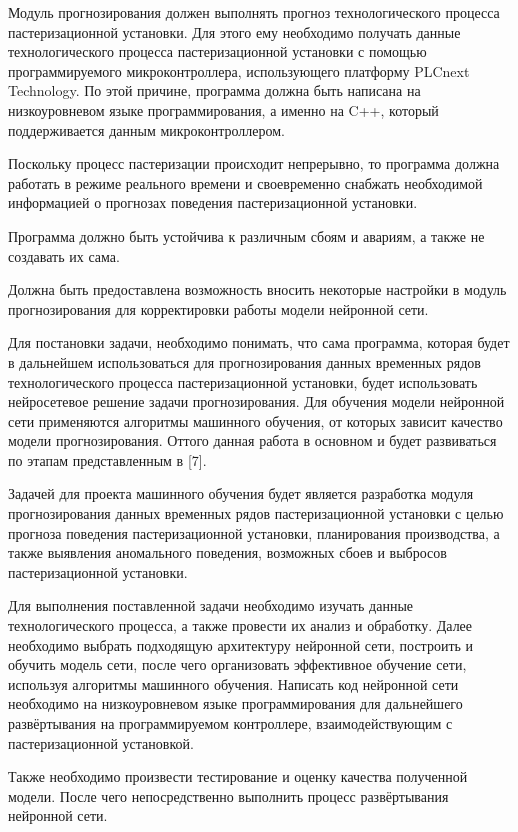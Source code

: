 {\gostFont
	\par \redline Модуль прогнозирования должен выполнять прогноз технологического процесса пастеризационной установки. Для этого ему необходимо получать данные технологического процесса пастеризационной установки с помощью программируемого микроконтроллера, использующего платформу PLCnext Technology. По этой причине, программа должна быть написана на низкоуровневом языке программирования, а именно на C++, который поддерживается данным микроконтроллером. 
	
	\par \redline Поскольку процесс пастеризации происходит непрерывно, то программа должна работать в режиме реального времени и своевременно снабжать необходимой информацией о прогнозах поведения пастеризационной установки. 
	
	\par \redline Программа должно быть устойчива к различным сбоям и авариям, а также не создавать их сама. 
	
	\par \redline Должна быть предоставлена возможность вносить некоторые настройки в модуль прогнозирования для корректировки работы модели нейронной сети. 
	
	\par \redline Для постановки задачи, необходимо понимать, что сама программа, которая будет в дальнейшем использоваться для прогнозирования данных временных рядов технологического процесса пастеризационной установки, будет использовать нейросетевое решение задачи прогнозирования. Для обучения модели нейронной сети применяются алгоритмы машинного обучения, от которых зависит качество модели прогнозирования. Оттого данная работа в основном и будет развиваться по этапам представленным в [7]. 
	
	\par \redline Задачей для проекта машинного обучения будет является разработка модуля прогнозирования данных временных рядов пастеризационной установки с целью прогноза поведения пастеризационной установки, планирования производства, а также выявления аномального поведения, возможных сбоев и выбросов пастеризационной установки. 
	
	\par \redline Для выполнения поставленной задачи необходимо изучать данные технологического процесса, а также провести их анализ и обработку. Далее необходимо выбрать подходящую архитектуру нейронной сети, построить и обучить модель сети, после чего организовать эффективное обучение сети, используя алгоритмы машинного обучения.  Написать код нейронной сети необходимо на низкоуровневом языке программирования для дальнейшего развёртывания на программируемом контроллере, взаимодействующим с пастеризационной установкой. 
	
	\par \redline Также необходимо произвести тестирование и оценку качества полученной модели. После чего непосредственно выполнить процесс развёртывания нейронной сети.  
	
	\par 
}

